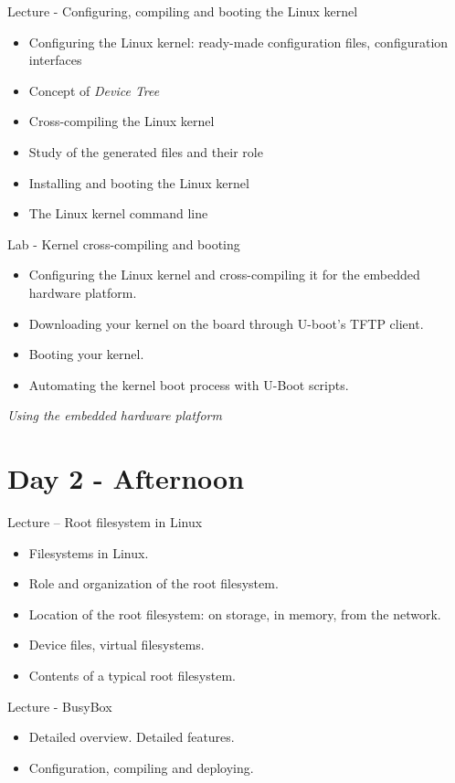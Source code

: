 \documentclass[a4paper,12pt,obeyspaces,spaces,hyphens]{article}
\begin{document}
\feagendatwocolumn
{Lecture - Configuring, compiling and booting the Linux kernel}
{
  \begin{itemize}
  \item Configuring the Linux kernel: ready-made configuration files,
    configuration interfaces
  \item Concept of {\em Device Tree}
  \item Cross-compiling the Linux kernel
  \item Study of the generated files and their role
  \item Installing and booting the Linux kernel
  \item The Linux kernel command line
  \end{itemize}
}
{Lab - Kernel cross-compiling and booting}
{
  \begin{itemize}
  \item Configuring the Linux kernel and cross-compiling it for the
    embedded hardware platform.
  \item Downloading your kernel on the board through U-boot's TFTP
    client.
  \item Booting your kernel.
  \item Automating the kernel boot process with U-Boot scripts.
  \end{itemize}

  \vspace{0.5cm}
  {\em Using the embedded hardware platform}
}

\section{Day 2 - Afternoon}

\feagendatwocolumn
{Lecture – Root filesystem in Linux}
{
  \begin{itemize}
  \item Filesystems in Linux.
  \item Role and organization of the root filesystem.
  \item Location of the root filesystem: on storage, in memory,
        from the network.
  \item Device files, virtual filesystems.
  \item Contents of a typical root filesystem.
  \end{itemize}
}
{Lecture - BusyBox}
{
  \begin{itemize}
  \item Detailed overview. Detailed features.
  \item Configuration, compiling and deploying.
  \end{itemize}
}
\end{document}
